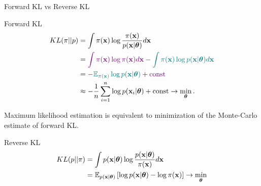 \begin{frame}{Forward KL vs Reverse KL}
	\begin{block}{Forward KL}
		\vspace{-0.5cm}
		\begin{align*}
			KL(\pi || p) &= \int \pi (\mathbf{x}) \log \frac{\pi(\mathbf{x})}{p(\mathbf{x} | \boldsymbol{\theta})} d \mathbf{x} \\
			&= {\color{violet}\int \pi (\mathbf{x}) \log \pi(\mathbf{x}) d \mathbf{x}} - {\color{teal}\int \pi (\mathbf{x}) \log p(\mathbf{x} | \boldsymbol{\theta}) d \mathbf{x}} \\
			&= - {\color{teal}\mathbb{E}_{\pi(\mathbf{x})} \log p(\mathbf{x} | \boldsymbol{\theta})} + {\color{violet}\text{const}} \\
			& \approx - \frac{1}{n} \sum_{i=1}^n \log p(\mathbf{x}_i | \boldsymbol{\theta}) + \text{const} \rightarrow \min_{\boldsymbol{\theta}}.
		\end{align*}
		\vspace{-0.5cm}
	\end{block}
	Maximum likelihood estimation is equivalent to minimization of the Monte-Carlo estimate of forward KL.
	\begin{block}{Reverse KL}
		\vspace{-0.5cm}
		\begin{align*}
			KL(p || \pi) &= \int p(\mathbf{x} | \boldsymbol{\theta}) \log \frac{p(\mathbf{x} | \boldsymbol{\theta})}{\pi(\mathbf{x})} d \mathbf{x} \\
			&= \mathbb{E}_{p(\mathbf{x} | \boldsymbol{\theta})} \left[\log p(\mathbf{x} | \boldsymbol{\theta}) - \log \pi(\mathbf{x})\right] \rightarrow \min_{\boldsymbol{\theta}}
		\end{align*}
		\vspace{-0.7cm}
	\end{block}
\end{frame}
